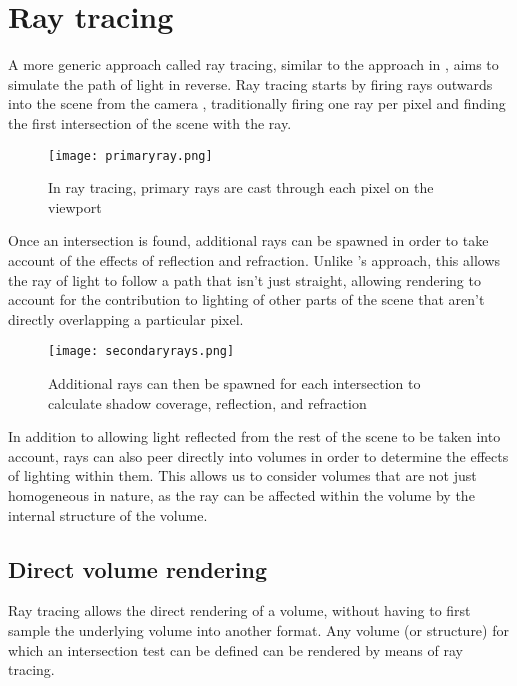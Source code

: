 \section{Ray tracing}
A more generic approach called ray tracing, similar to the approach in \cite{engel02interactivehigh-quality}, aims to simulate the path of light in reverse. Ray tracing starts by firing rays outwards into the scene from the camera \parencite{appel68raytracing}, traditionally firing one ray per pixel and finding the first intersection of the scene with the ray.

\begin{figure}
\centering
	\texttt{[image: primaryray.png]}
	\caption{In ray tracing, primary rays are cast through each pixel on the viewport}
	\label{fig:primaryray}
\end{figure}

Once an intersection is found, additional rays can be spawned in order to take account of the effects of reflection and refraction. Unlike \citeauthor{engel02interactivehigh-quality}'s approach, this allows the ray of light to follow a path that isn't just straight, allowing rendering to account for the contribution to lighting of other parts of the scene that aren't directly overlapping a particular pixel.

\begin{figure}
\centering
	\texttt{[image: secondaryrays.png]}
	\caption{Additional rays can then be spawned for each intersection to calculate shadow coverage, reflection, and refraction}
	\label{fig:secondaryrays}
\end{figure}

In addition to allowing light reflected from the rest of the scene to be taken into account, rays can also peer directly into volumes in order to determine the effects of lighting within them. This allows us to consider volumes that are not just homogeneous in nature, as the ray can be affected within the volume by the internal structure of the volume.

\subsection{Direct volume rendering}
Ray tracing allows the direct rendering of a volume, without having to first sample the underlying volume into another format. Any volume (or structure) for which an intersection test can be defined can be rendered by means of ray tracing. 

